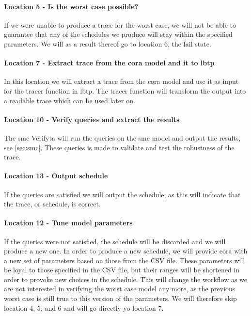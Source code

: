 \paragraph{Location 5 - Is the worst case possible?} 
If we were unable to produce a trace for the worst case, we will not be able to guarantee that any of the schedules we produce will stay within the specified parameters. 
We will as a result thereof go to location 6, the fail state.

\paragraph{Location 7 - Extract trace from the \gls{cora} model and it to \acrshort{lbtp}} 
In this location we will extract a trace from the \gls{cora} model and use it as input for the tracer function in \acrshort{lbtp}. 
The tracer function will transform the output into a readable trace which can be used later on.


\paragraph{Location 10 - Verify queries and extract the results} 
The \gls{smc} Verifyta will run the queries on the \gls{smc} model and output the results, see \cref{sec:smc}. 
These queries is made to validate and test the robustness of the trace.

\paragraph{Location 13 - Output schedule} 
If the queries are satisfied we will output the schedule, as this will indicate that the trace, or schedule, is correct.

\paragraph{Location 12 - Tune model parameters} 
If the queries were not satisfied, the schedule will be discarded and we will produce a new one. 
In order to produce a new schedule, we will provide \gls{cora} with a new set of parameters based on those from the CSV file. 
These parameters will be loyal to those specified in the CSV file, but their ranges will be shortened in order to provoke new choices in the schedule. 
This will change the workflow as we are not interested in verifying the worst case model any more, as the previous worst case is still true to this version of the parameters. 
We will therefore skip location 4, 5, and 6 and will go directly yo location 7.

